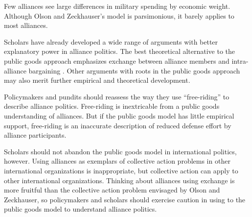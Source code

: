 \documentclass[12pt]{article}
\begin{document}
Few alliances see large differences in military spending by economic weight. 
Although Olson and Zeckhauser's model is parsimonious, it barely applies to most alliances. 


Scholars have already developed a wide range of arguments with better explanatory power in alliance politics. 
The best theoretical alternative to the public goods approach emphasizes exchange between alliance members and intra-alliance bargaining \citep{Morrow1991, Norrlof2010, Brooksetal2013, Johnson2015, Kim2016}. 
Other arguments with roots in the public goods approach \citep{SandlerHartley2001} may also merit further empirical and theoretical development. 


Policymakers and pundits should reassess the way they use ``free-riding'' to describe alliance politics. 
Free-riding is inextricable from a public goods understanding of alliances.
But if the public goods model has little empirical support, free-riding is an inaccurate description of reduced defense effort by alliance participants.  


Scholars should not abandon the public goods model in international politics, however.   
Using alliances as exemplars of collective action problems in other international organizations is inappropriate, but collective action can apply to other international organizations. 
Thinking about alliances using exchange is more fruitful than the collective action problem envisaged by Olson and Zeckhauser, so policymakers and scholars should exercise caution in using to the public goods model to understand alliance politics.  



\singlespace


 
\end{document}
